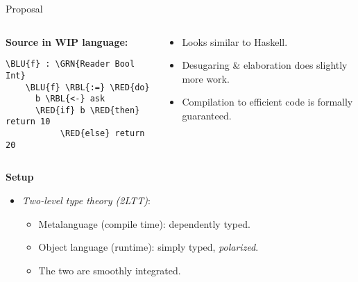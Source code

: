 \documentclass[dvipsnames,aspectratio=169]{beamer}
\theoremstyle{remark}
\newcommand{\RED}[1]{{\color{BrickRed} #1}}
\newcommand{\GRN}[1]{{\color{OliveGreen} #1}}
\newcommand{\RBL}[1]{{\color{RoyalBlue} #1}}
\newcommand{\BLU}[1]{{\color{Blue} #1}}
\begin{document}
\begin{frame}[fragile]{Proposal}

\begin{columns}
\begin{column}{0.3\textwidth}
\textbf{Source in WIP language:}
\begin{Verbatim}[commandchars=\\\{\}]
    \BLU{f} : \GRN{Reader Bool Int}
    \BLU{f} \RBL{:=} \RED{do}
      b \RBL{<-} ask
      \RED{if} b \RED{then} return 10
           \RED{else} return 20
\end{Verbatim}

\end{column}
\begin{column}{0.6\textwidth}
\begin{itemize}
\item Looks similar to Haskell.
\item Desugaring \& elaboration does slightly more work.
\item Compilation to efficient code is formally guaranteed.
\end{itemize}
\end{column}
\end{columns}
\vspace{1em}
\pause

\begin{block}{}
\textbf{Setup}
\begin{itemize}
\item \emph{Two-level type theory (2LTT)}:
  \begin{itemize}
    \item Metalanguage (compile time): dependently typed.
    \item Object language (runtime): simply typed, \emph{polarized}.
    \item The two are smoothly integrated.
  \end{itemize}
\end{itemize}
\end{block}

\end{frame}
\end{document}
